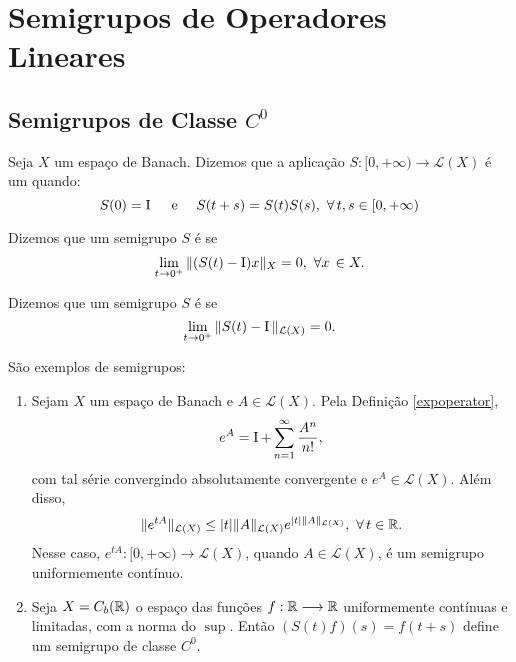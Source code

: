 \chapter{Semigrupos de Operadores Lineares}

\section{Semigrupos de Classe $C^0$}



\begin{definition}\label{def-semigrupo}
     Seja $X$ um espaço de Banach. Dizemos que a aplicação $S:[0,+\infty)\longrightarrow \mathcal{L}(X)$ é um   quando:
\begin{equation}
S(0)=\operatorname{I}\quad \text{ e }\quad S(t+s)=S(t)S(s),\ \forall\, t,s\in [0,+\infty)
\end{equation}

Dizemos que um semigrupo $S$ é  se
\begin{equation}
\lim\limits_{t\to0^+} \|(S(t)-\operatorname{I})x\|_X =0,\ \forall x\,\in X.
\end{equation}

Dizemos que um semigrupo $S$ é  se 
\begin{equation}
\lim\limits_{t\to 0^+}\|S(t)-\operatorname{I}\|_{\mathcal{L}(X)}=0.
\end{equation}


\end{definition}

   \begin{example}\label{ex} São exemplos de semigrupos:
        \begin{enumerate}
            \item Sejam $X$ um espaço de Banach e  $A\in \mathcal{L}(X)$. Pela Definição \ref{expoperator},
            \[e^{A}=\operatorname{I}+\sum_{n=1}^\infty \frac{A^n}{n!},\]
com tal série convergindo absolutamente convergente e $e^{A}\in \mathcal{L}(X)$. Além disso, 
\begin{equation*}
\|e^{tA}\|_{\mathcal{L}(X)}\leq |t| \|A\|_{\mathcal L (X)}e^{|t|\|A\|_{\mathcal{L}(X)}},\ \forall\, t\in \mathbb{R}.
\end{equation*}
Nesse caso,  $e^{tA}:[0,+\infty)\to \mathcal{L}(X)$, quando $A\in \mathcal{L}(X)$, é um semigrupo uniformemente contínuo.

\item Seja $X=C_b(\mathbb{R})$  o espaço das funções $f:\mathbb{R}\longrightarrow \mathbb{R}$ uniformemente contínuas e limitadas, com a norma do $\sup$. Então $(S(t)f)(s)=f(t+s)$ define um semigrupo de classe $C^0$.
        \end{enumerate}
    \end{example}

